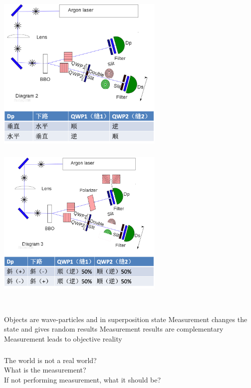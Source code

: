\begin{frame}
    \frametitle{}
    \begin{center}
        \includegraphics[width=0.6\textwidth]{figs/c2.png} \\
    \end{center} 
\end{frame}

\begin{frame}
    \frametitle{}
    \begin{center}
        \includegraphics[width=0.6\textwidth]{figs/c3.png} \\
    \end{center} 
\end{frame}

\begin{frame}
    \begin{tcolorbox4}[Conclusion]
        ~~\\
    \begin{enumerate}
        \Item Objects are wave-particles and in superposition state
        \Item Measurement changes the state and gives random results
        \Item Measurement results are complementary
        \Item Measurement leads to objective reality
    \end{enumerate}
    \end{tcolorbox4}
\end{frame}

\begin{frame}
    \frametitle{}
    \centering
    {
      \large  {The world is not a real world?\\
      What is the measurement? \\
      If not performing measurement, what it should be?}
    }
\end{frame}
